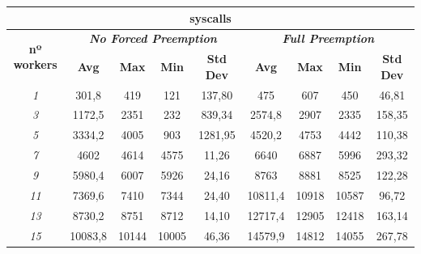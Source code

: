 \documentclass[../main.tex]{subfiles}
\begin{document}
\begin{table}[htp]
\begin{tabular}{|c|c|c|c|c|c|c|c|c|}
\hline
\multicolumn{9}{|c|}{\textbf{syscalls}}                                                                                                                              \\ \hline
\multirow{2}{*}{\textbf{nº workers}} & \multicolumn{4}{c|}{\textit{\textbf{No Forced Preemption}}}   & \multicolumn{4}{c|}{\textit{\textbf{Full Preemption}}}        \\ \cline{2-9} 
                                     & \textbf{Avg} & \textbf{Max} & \textbf{Min} & \textbf{Std Dev} & \textbf{Avg} & \textbf{Max} & \textbf{Min} & \textbf{Std Dev} \\ \hline
\textit{1}                           & 301,8        & 419          & 121          & 137,80           & 475          & 607          & 450          & 46,81            \\ \hline
\textit{3}                           & 1172,5       & 2351         & 232          & 839,34           & 2574,8       & 2907         & 2335         & 158,35           \\ \hline
\textit{5}                           & 3334,2       & 4005         & 903          & 1281,95          & 4520,2       & 4753         & 4442         & 110,38           \\ \hline
\textit{7}                           & 4602         & 4614         & 4575         & 11,26            & 6640         & 6887         & 5996         & 293,32           \\ \hline
\textit{9}                           & 5980,4       & 6007         & 5926         & 24,16            & 8763         & 8881         & 8525         & 122,28           \\ \hline
\textit{11}                          & 7369,6       & 7410         & 7344         & 24,40            & 10811,4      & 10918        & 10587        & 96,72            \\ \hline
\textit{13}                          & 8730,2       & 8751         & 8712         & 14,10            & 12717,4      & 12905        & 12418        & 163,14           \\ \hline
\textit{15}                          & 10083,8      & 10144        & 10005        & 46,36            & 14579,9      & 14812        & 14055        & 267,78           \\ \hline

\end{tabular}
\end{table}
\end{document}
